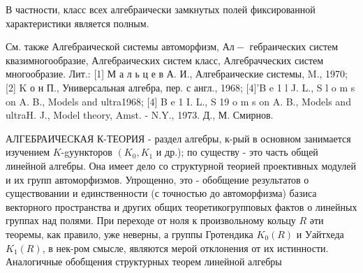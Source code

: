 \documentclass[10pt]{article}
\begin{document}
В частности, класс всех алгебраически замкнутых полей фиксированной характеристики является полным.



См. также Алгебраической системы автоморфизм, $А л-$ гебраических систем квазимногообразие, Алгебраических систем класс, Алгебрачческих систем многообразие. Лит.: [1] М а л ь ц е в А. И., Алгебраические системы, M., 1970; [2] K о н П., Универсальная алгебра, пер. с англ., 1968; [4]'B e 1 l J. L., S l o m s on A. B., Models and ultra1968; [4] B e 1 I. L., S 19 o m s on A. B., Models and ultraH. J., Model theory, Amst. - N.Y., 1973. Д., М. Смирнов.



АЛГЕБРАИЧЕСКАЯ К-ТЕОРИЯ - раздел алгебры, к-рый в основном занимается изучением $K$-gуункторов $\left(K_{0}, K_{1}\right.$ и др.); по существу - это часть общей линейной алгебры. Она имеет дело со структурной теорией проективных модулей и их групп автоморфизмов. Упрощенно, это - обобщение результатов о существовании и единственности (с точностью до автоморфизма) базиса векторного пространства и других общих теоретикогрупповых фактов о линейных группах над полями. При переходе от ноля к произвольному кольцу $R$ әти теоремы, как правило, уже неверны, а группы Гротендика $K_{0}(R)$ и Уайтхеда $K_{1}(R)$, в нек-ром смысле, являются мерой отклонения от их истинности. Аналогичные обобщения структурных теорем линейной алгебры
\end{document}
